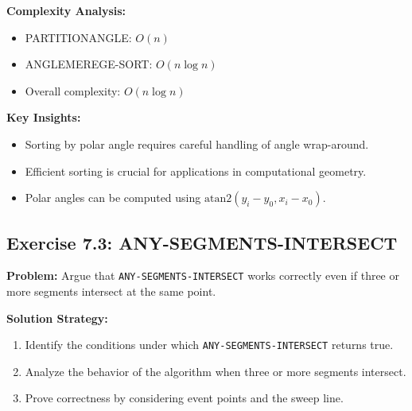 \textbf{Complexity Analysis:}
\begin{itemize}[noitemsep]
    \item PARTITIONANGLE: $O(n)$
    \item ANGLEMEREGE-SORT: $O(n \log n)$
    \item Overall complexity: $O(n \log n)$
\end{itemize}

\textbf{Key Insights:}
\begin{itemize}[noitemsep]
    \item Sorting by polar angle requires careful handling of angle wrap-around.
    \item Efficient sorting is crucial for applications in computational geometry.
    \item Polar angles can be computed using $\text{atan2}(y_i - y_0, x_i - x_0)$.
\end{itemize}

\subsection{Exercise 7.3: ANY-SEGMENTS-INTERSECT}
\textbf{Problem:} Argue that \texttt{ANY-SEGMENTS-INTERSECT} works correctly even if three or more segments intersect at the same point.

\begin{center}
\end{center}

\textbf{Solution Strategy:}
\begin{enumerate}[noitemsep]
    \item Identify the conditions under which \texttt{ANY-SEGMENTS-INTERSECT} returns true.
    \item Analyze the behavior of the algorithm when three or more segments intersect.
    \item Prove correctness by considering event points and the sweep line.
\end{enumerate}


